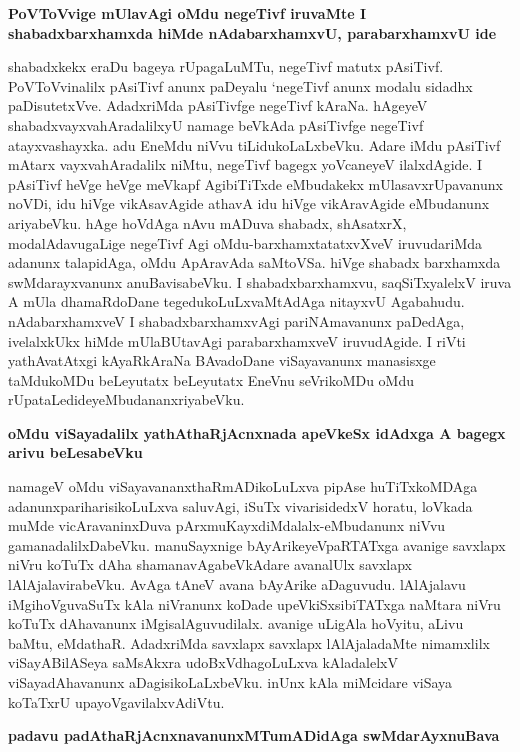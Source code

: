 {\bigskip
\noindent
{\large\bf PoVToVvige mUlavAgi oMdu negeTivf iruvaMte I shabadxbarxhamxda hiMde nAdabarxhamxvU, para\-barxhamxvU ide}}\label{page199}
\medskip

\noindent
shabadxkekx eraDu bageya rUpagaLuMTu, negeTivf matutx pAsiTivf. PoVToVvinalilx pAsiTivf anunx paDeyalu `negeTivf anunx modalu sidadhx paDisutetxVve. AdadxriMda pAsiTivfge negeTivf kAraNa. hAgeyeV shabadx\-vayxvahAradalilxyU namage beVkAda pAsiTivfge negeTivf atayxvashayxka. adu EneMdu niVvu tiLidu\-koLaLx\-beVku. Adare iMdu pAsiTivf mAtarx vayxvahAradalilx niMtu, negeTivf bagegx yoVcaneyeV ilalxdA\-gide. I pAsi\-Tivf heVge heVge meVkapf AgibiTiTxde eMbudakekx mUlasavxrUpavanunx noVDi, idu hiVge vikAsa\-vAgide athavA idu hiVge vikAravAgide eMbudanunx ariyabeVku. hAge hoVdAga nAvu mADuva shabadx, shAsatxrX, modalAdavugaLige negeTivf Agi oMdu-barxhamxtatatxvXveV iruvudariMda adanunx talapi\-dAga, oMdu ApAravAda saMtoVSa. hiVge shabadx barxhamxda swMdarayxvanunx anuBavisabeVku. I shabadx\-barxhamxvu, saqSiTxyalelxV iruva A mUla dhamaRdoDane tegedukoLuLxvaMtAdAga nitayxvU Agabahudu. nAda\-barxhamxveV I shabadxbarxhamxvAgi pariNAmavanunx paDedAga, ivelalxkUkx hiMde mUlaBUtavAgi para\-barxhamxveV iruvudAgide. I riVti yathAvatAtxgi kAyaRkAraNa BAvadoDane viSayavanunx manasisxge taMdu\-koMDu beLeyutatx beLeyutatx EneVnu seVrikoMDu oMdu rUpataLedideyeMbudananxriyabeVku.

{\bigskip
\noindent
{\large\bf oMdu viSayadalilx yathAthaRjAcnxnada apeVkeSx idAdxga A bagegx arivu beLesabeVku}}\label{page200}
\medskip

\noindent
namageV oMdu viSayavananxthaRmADikoLuLxva pipAse huTiTxkoMDAga adanunx\break pariharisikoLuLxva saluvAgi, iSuTx vivarisidedxV horatu, loVkada muMde vicAra\-vaninxDuva pArxmuKayxdiMdalalx-eMbu\-danunx niVvu gamanadalilxDabeVku. manuSayxnige bAyArikeyeVpaRTATxga avanige savxlapx niVru koTuTx dAha shamana\-vAgabeVkAdare avanalUlx savxlapx lAlAjalavirabeVku. AvAga tAneV avana bAyArike aDagu\-vudu. lAlAjalavu iMgihoVguvaSuTx kAla niVranunx koDade upeVkiSxsibiTATxga naMtara niVru koTuTx dAha\-vanunx iMgisalAguvudilalx. avanige uLigAla hoVyitu, aLivu baMtu, eMdathaR. AdadxriMda savxlapx savxlapx lAlAjaladaMte nimamxlilx viSayABilASeya saMsAkxra udoBxVdhagoLuLxva kAladalelxV viSayadAha\-vanunx aDagisikoLaLxbeVku. inUnx kAla miMcidare viSaya koTaTxrU upayoVgavilalxvAdiVtu.

\eject

{\bigskip
\noindent
{\large\bf padavu padAthaRjAcnxnavanunxMTumADidAga swMdarAyxnuBava}}\label{page201}
\medskip

